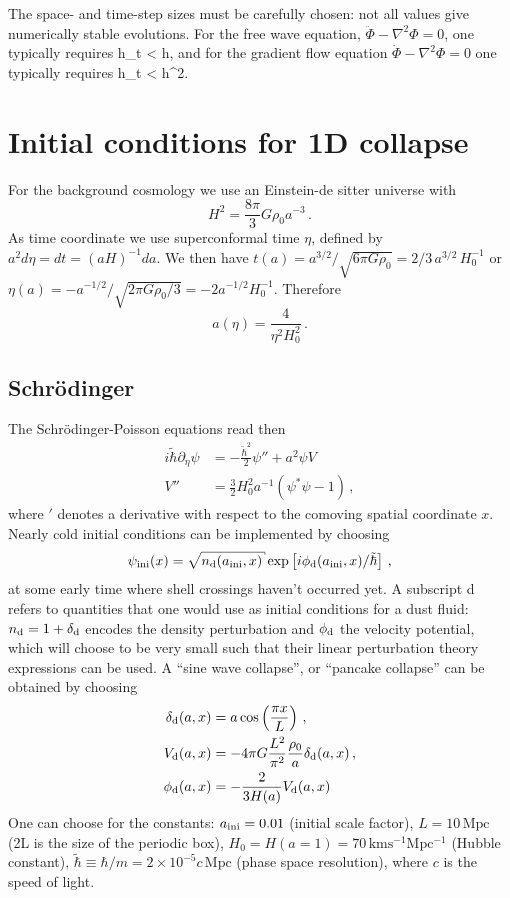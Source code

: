 \documentclass[amsmath,amssymb,12pt, eqsecnum]{revtex4}
\begin{document}
The space- and time-step sizes must be carefully chosen: not all values give numerically stable evolutions. For the free wave equation, $\ddot{\Phi} - \nabla^2\Phi =0$, one typically requires
\bea
h_t < h,
\eea
and for the gradient flow equation $\dot{\Phi} - \nabla^2\Phi =0$ one typically requires
\bea
h_t < h^2.
\eea
\section{Initial conditions for 1D collapse}
For the background cosmology we use an Einstein-de sitter universe with
\begin{equation}
H^2 = \frac{8 \pi}{3} G \rho_0 a^{-3}\,.
\end{equation}
As time coordinate we use superconformal time $\eta$, defined by $a^2 d \eta = dt = (a H)^{-1} da$. We then have $t(a) = a^{3/2}/\sqrt{6 \pi G \rho_0} = 2/3\,a^{3/2}\,H_0^{-1} $ or $\eta(a) = - a^{-1/2}/\sqrt{2\pi G \rho_0/3}= -2  a^{-1/2} H_0^{-1} $. Therefore
\begin{equation}\label{inipsi}
a(\eta) =  \frac{4 }{\eta^{2} H_0^2}\,.
\end{equation}

\subsection{Schr\"odinger}
The Schr\"odinger-Poisson equations read then
\begin{align}
i \tilde{\hbar} \partial_\eta  \psi &= - \frac{\tilde{\hbar}^2}{2 } \psi'' + a^2 \psi V\\
V'' &=  \tfrac{3}{2} H_0^2 a^{-1} (\psi^* \psi -1)\,,
\end{align}
where $'$ denotes a derivative with respect to the comoving spatial coordinate $x$. Nearly cold initial conditions can be implemented by choosing 
\begin{equation}\label{inipsi}
\psi_{\rm{ini}}(x)= \sqrt{n_{\rm d}(a_{\rm{ini}},x)} \exp\left[ i \phi_{\rm d}(a_{\rm{ini}},x)/\tilde \hbar \right]\,,
\end{equation}
at some early time where shell crossings haven't occurred yet. A subscript d refers to quantities that one would use as initial conditions for a dust fluid: $n_{\rm d} = 1 + \delta_{\rm d}$ encodes the density perturbation and $\phi_{\rm d}$ the velocity potential, which will choose to be very small such that their linear perturbation theory expressions can be used. A ``sine wave collapse'', or ``pancake collapse'' can be obtained by choosing
\begin{align} \label{delini}
\delta_{\rm d}(a,x) &= a \cos\left(\frac{\pi x}{L}\right) \,,\\
V_{\rm d}(a,x) &= -  4 \pi G \frac{L^2}{\pi^2} \frac{\rho_0}{a}  \delta_{\rm d}(a,x) \,,\\
\phi_{\rm d}(a,x) &= -\frac{2}{3 H(a)}V_{\rm d}(a,x)
\end{align}
One can choose for the constants: $a_{\rm ini} =0.01$ (initial scale factor), $L=10\,\mathrm{Mpc}$ (2L is the size of the periodic box), $H_0 = H(a=1) = 70\,\mathrm{km s^{-1} Mpc^{-1}}$ (Hubble constant), $\tilde \hbar\equiv \hbar/m = 2\times 10^{-5} c\, \mathrm{Mpc}$ (phase space resolution), where $c$ is the speed of light.
\end{document}
